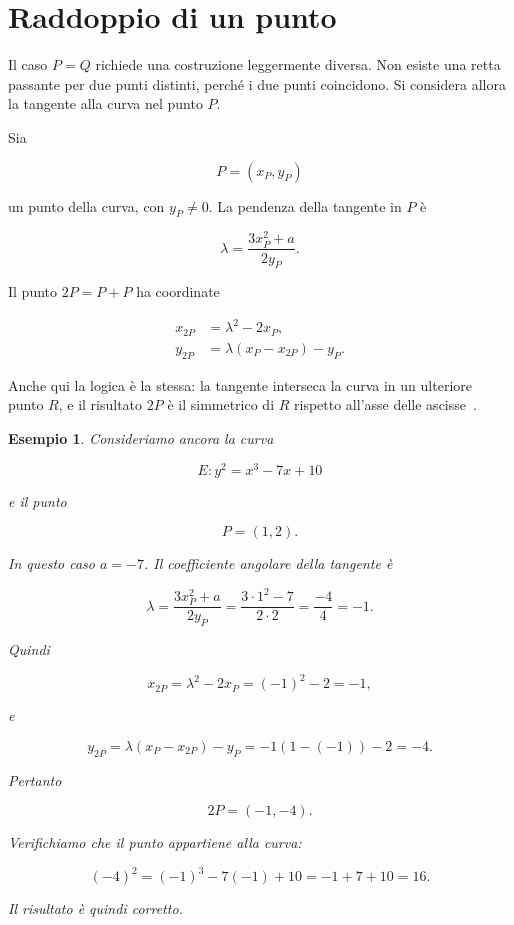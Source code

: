 \documentclass[12pt,a4paper,oneside]{report}
\newtheorem{example}{Esempio}[chapter]
\begin{document}
\section{Raddoppio di un punto}

Il caso \(P=Q\) richiede una costruzione leggermente diversa. Non esiste una retta passante per due punti distinti, perché i due punti coincidono. Si considera allora la tangente alla curva nel punto \(P\).

Sia

\[
P=(x_P,y_P)
\]

un punto della curva, con \(y_P \neq 0\). La pendenza della tangente in \(P\) è

\begin{equation}
    \lambda = \frac{3x_P^2+a}{2y_P}.
    \label{eq:lambda-double-real}
\end{equation}

Il punto \(2P=P+P\) ha coordinate

\begin{align}
    x_{2P} &= \lambda^2 - 2x_P, \label{eq:double-x-real} \\
    y_{2P} &= \lambda(x_P-x_{2P})-y_P. \label{eq:double-y-real}
\end{align}

Anche qui la logica è la stessa: la tangente interseca la curva in un ulteriore punto \(R\), e il risultato \(2P\) è il simmetrico di \(R\) rispetto all'asse delle ascisse~\cite{margara_ec,sec1}.

\begin{example}
Consideriamo ancora la curva

\[
E: y^2 = x^3 - 7x + 10
\]

e il punto

\[
P=(1,2).
\]

In questo caso \(a=-7\). Il coefficiente angolare della tangente è

\[
\lambda = \frac{3x_P^2+a}{2y_P}
= \frac{3\cdot 1^2 -7}{2\cdot 2}
= \frac{-4}{4}
= -1.
\]

Quindi

\[
x_{2P} = \lambda^2 -2x_P = (-1)^2 -2 = -1,
\]

e

\[
y_{2P} = \lambda(x_P-x_{2P})-y_P
= -1(1-(-1))-2
= -4.
\]

Pertanto

\[
2P=(-1,-4).
\]

Verifichiamo che il punto appartiene alla curva:

\[
(-4)^2 = (-1)^3 -7(-1)+10 = -1+7+10 = 16.
\]

Il risultato è quindi corretto.
\end{example}
\end{document}
